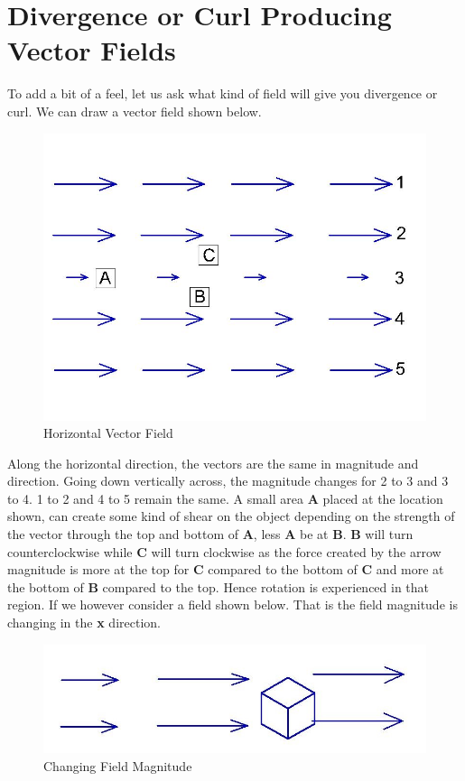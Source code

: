 \section{Divergence or Curl Producing Vector Fields}
To add a bit of a feel, let us ask what kind of field will give you divergence or curl. We can draw a vector field shown below.
\begin{figure}[h]
\centering
\includegraphics[width=1\linewidth]{./graphics/fig171}
\caption{Horizontal Vector Field}
\end{figure}

Along the horizontal direction, the vectors are the same in magnitude and direction. Going down vertically across, the magnitude changes for 2 to 3 and 3 to 4. 1 to 2 and 4 to 5 remain the same. A small area \textbf{A} placed at the location shown, can create some kind of shear on the object depending on the strength of the vector through the top and bottom of \textbf{A}, less \textbf{A} be at \textbf{B}. \textbf{B} will turn counterclockwise while \textbf{C} will turn clockwise as the force created by the arrow magnitude is more at the top for \textbf{C} compared to the bottom of \textbf{C} and more at the bottom of \textbf{B} compared to the top. Hence rotation is experienced in that region. If we however consider a field shown below. That is the field magnitude is changing in the \textbf{x} direction.
\begin{figure}[h]
\centering
\includegraphics[width=1\linewidth]{./graphics/fig172}
\caption{Changing Field Magnitude}
\end{figure}

